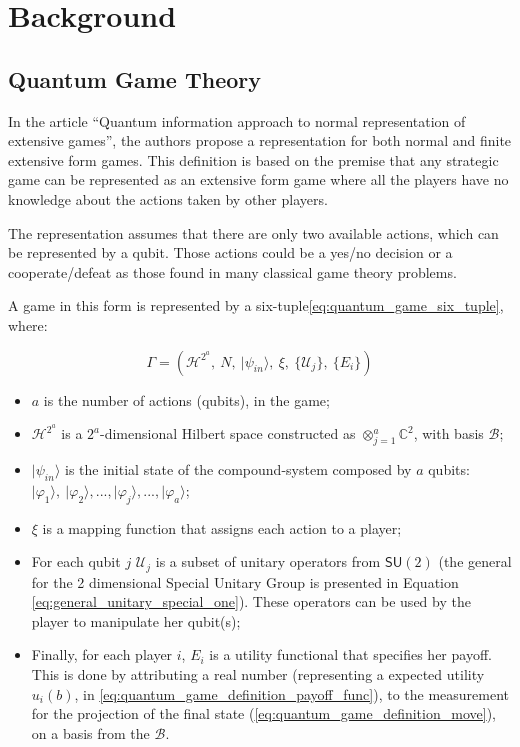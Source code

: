 \documentclass[10pt,twocolumn]{llncs}
\begin{document}
\section{Background}
\label{sec:bck}


\subsection{Quantum Game Theory}
\label{sec:background_quantum_game_theory}



In the article ``Quantum information approach to normal representation of extensive games''\cite{Fra2011a}, the authors propose a representation
for both normal and finite extensive form games\cite{Fra2011}. This definition is based on the premise that any strategic game can be represented as an extensive form game where all the players have no knowledge about the actions taken by other players. 

The representation assumes that there
are only two available actions, which can be represented by a qubit.
Those actions could be a yes/no decision or a cooperate/defeat as
those found in many classical game theory problems. 

A game in this
form is represented by a six-tuple\ref{eq:quantum_game_six_tuple},
where:

\begin{equation}
\Gamma=(\mathcal{H}^{2^{a}},\: N,\:\vert\psi_{in}\rangle,\:\xi,\:\{\mathcal{U}_{j}\},\:\{E_{i}\})\label{eq:quantum_game_six_tuple}
\end{equation}

\begin{itemize}
\item $a$ is the number of actions (qubits), in the game; 
\item $\mathcal{H}^{2^{a}}$ is a $2^{a}$-dimensional Hilbert space constructed
as $\otimes_{j=1}^{a}\mathbb{C}^{2}$, with basis $\mathcal{B}$;
\item $\vert\psi_{in}\rangle$ is the initial state of the compound-system
composed by $a$ qubits: $\vert\varphi_{1}\rangle,\:\vert\varphi_{2}\rangle, ..., \vert\varphi_{j}\rangle, ..., \vert\varphi_{a}\rangle$;
\item $\xi$ is a mapping function that assigns each action to a player;
\item For each qubit $j$ $\mathcal{U}_{j}$ is a subset of unitary operators from $\mathsf{SU}(2)$ (the general for the 2 dimensional Special Unitary Group is presented in Equation \ref{eq:general_unitary_special_one}).
These operators can be used by the player to manipulate her qubit(s);
\item Finally, for each player $i$, $E_{i}$ is a utility functional that
specifies her payoff. This is done by attributing a real number (representing a expected utility $ u_{i}(b)$, in \ref{eq:quantum_game_definition_payoff_func}), to the measurement for the projection of the final state (\ref{eq:quantum_game_definition_move}), on a basis from the $\mathcal{B}$.\end{itemize}
\end{document}
